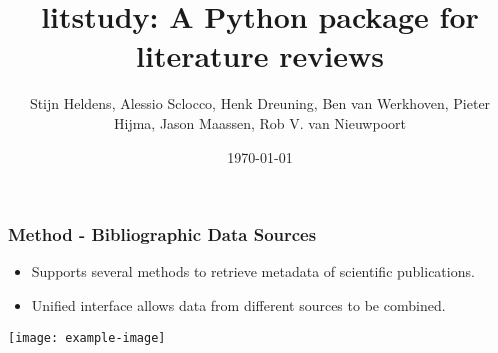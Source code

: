 \documentclass{beamer}
\title{litstudy: A Python package for literature reviews}
\author{Stijn Heldens, Alessio Sclocco, Henk Dreuning, Ben van Werkhoven, Pieter Hijma, Jason Maassen, Rob V. van Nieuwpoort}
\date{\today}
\begin{document}
\begin{frame}
\frametitle{Method - Bibliographic Data Sources}
\begin{itemize}
\item Supports several methods to retrieve metadata of scientific publications.
\item Unified interface allows data from different sources to be combined.
\end{itemize}
\texttt{[image: example-image]}
\end{frame}
\end{document}
